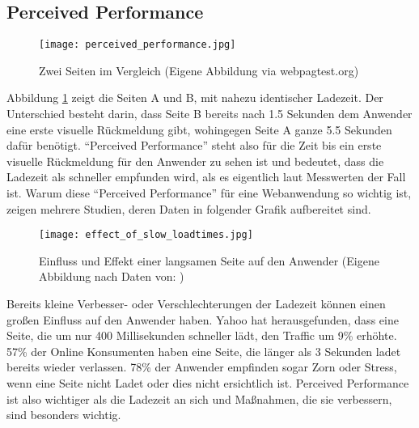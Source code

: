 	\pagebreak


	\subsection{Perceived Performance} %
	\label{sub:perceived_performance}
		\begin{figure}[htbp]
			\begin{center}
				\texttt{[image: perceived\_performance.jpg]}
				\caption{Zwei Seiten im Vergleich (Eigene Abbildung via webpagtest.org)}
				\label{fig:perceived_performance}
			\end{center}
		\end{figure}

		Abbildung \ref{fig:perceived_performance} zeigt die Seiten A und B, mit nahezu identischer Ladezeit. Der Unterschied besteht darin, dass Seite B bereits nach 1.5 Sekunden dem Anwender eine erste visuelle Rückmeldung gibt, wohingegen Seite A ganze 5.5 Sekunden dafür benötigt.
		"`Perceived Performance"' steht also für die Zeit bis ein erste visuelle Rückmeldung für den Anwender zu sehen ist und bedeutet, dass die Ladezeit als schneller empfunden wird, als es eigentlich laut Messwerten der Fall ist. Warum diese "`Perceived Performance"' für eine Webanwendung so wichtig ist, zeigen mehrere Studien, deren Daten in folgender Grafik aufbereitet sind.

		\begin{figure}[htbp]
			\begin{center}
				\texttt{[image: effect\_of\_slow\_loadtimes.jpg]}
				\caption{Einfluss und Effekt einer langsamen Seite auf den Anwender (Eigene Abbildung nach Daten von: \autocite[p. 8]{radware14})}
				\label{fig:effect_of_slow_loadtimes}
			\end{center}
		\end{figure}

		Bereits kleine Verbesser- oder Verschlechterungen der Ladezeit können einen großen Einfluss auf den Anwender haben. Yahoo hat herausgefunden, dass eine Seite, die um nur 400 Millisekunden schneller lädt, den Traffic um 9\% erhöhte.\autocite{stefanov08} 57\% der Online Konsumenten haben eine Seite, die länger als 3 Sekunden ladet bereits wieder verlassen. 78\% der Anwender empfinden sogar Zorn oder Stress, wenn eine Seite nicht Ladet oder dies nicht ersichtlich ist. Perceived Performance ist also wichtiger als die Ladezeit an sich und Maßnahmen, die sie verbessern, sind besonders wichtig.

